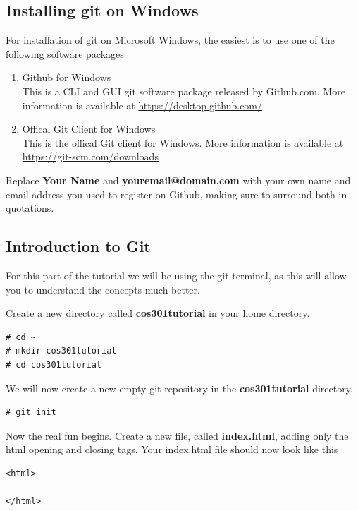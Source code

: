 \documentclass[a4paper,10pt]{article}
\begin{document}
\subsection{Installing git on Windows}

For installation of git on Microsoft Windows, the easiest is to use one of the following software packages

\begin{enumerate}
\item Github for Windows\\
This is a CLI and GUI git software package released by Github.com.  More information is available at \url{https://desktop.github.com/}
\item Offical Git Client for Windows\\
This is the offical Git client for Windows. More information is available at \url{https://git-scm.com/downloads}
\end{enumerate}

Replace \textbf{Your Name} and \textbf{youremail@domain.com} with your own name and email address you used to register on Github, making sure to surround both in quotations.

\subsection{Introduction to Git}

For this part of the tutorial we will be using the git terminal, as this will allow you to understand the concepts much better.

Create a new directory called \textbf{cos301tutorial} in your home directory.
\begin{lstlisting}[style=TerminalStyle]
# cd ~
# mkdir cos301tutorial
# cd cos301tutorial
\end{lstlisting}

We will now create a new empty git repository in the \textbf{cos301tutorial} directory.
\begin{lstlisting}[style=TerminalStyle]
# git init
\end{lstlisting}

Now the real fun begins. Create a new file, called \textbf{index.html}, adding only the html opening and closing tags.
Your index.html file should now look like this
\begin{lstlisting}[style=HtmlStyle]
<html>

</html>
\end{lstlisting}
\end{document}
